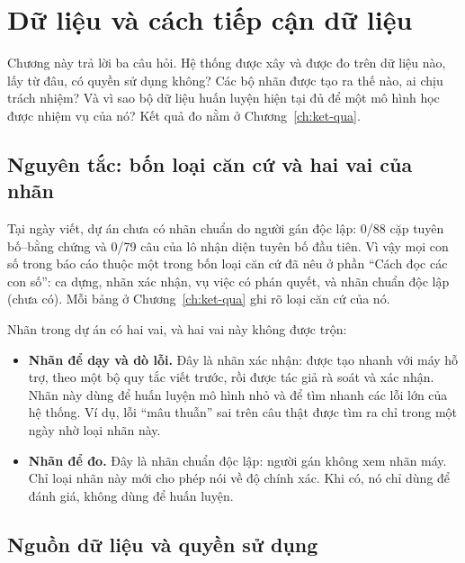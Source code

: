 \chapter{Dữ liệu và cách tiếp cận dữ liệu}\label{ch:du-lieu}

Chương này trả lời ba câu hỏi. Hệ thống được xây và được đo trên dữ liệu nào, lấy từ đâu, có quyền sử dụng không? Các bộ nhãn được tạo ra thế nào, ai chịu trách nhiệm? Và vì sao bộ dữ liệu huấn luyện hiện tại đủ để một mô hình học được nhiệm vụ của nó? Kết quả đo nằm ở Chương~\ref{ch:ket-qua}.

\section{Nguyên tắc: bốn loại căn cứ và hai vai của nhãn}\label{sec:can-cu}

Tại ngày viết, dự án chưa có nhãn chuẩn do người gán độc lập: 0/88 cặp tuyên bố–bằng chứng và 0/79 câu của lô nhận diện tuyên bố đầu tiên. Vì vậy mọi con số trong báo cáo thuộc một trong bốn loại căn cứ đã nêu ở phần “Cách đọc các con số”: ca dựng, nhãn xác nhận, vụ việc có phán quyết, và nhãn chuẩn độc lập (chưa có). Mỗi bảng ở Chương~\ref{ch:ket-qua} ghi rõ loại căn cứ của nó.

Nhãn trong dự án có hai vai, và hai vai này không được trộn:
\begin{itemize}
\item \textbf{Nhãn để dạy và dò lỗi.} Đây là nhãn xác nhận: được tạo nhanh với máy hỗ trợ, theo một bộ quy tắc viết trước, rồi được tác giả rà soát và xác nhận. Nhãn này dùng để huấn luyện mô hình nhỏ và để tìm nhanh các lỗi lớn của hệ thống. Ví dụ, lỗi “mâu thuẫn” sai trên câu thật được tìm ra chỉ trong một ngày nhờ loại nhãn này.
\item \textbf{Nhãn để đo.} Đây là nhãn chuẩn độc lập: người gán không xem nhãn máy. Chỉ loại nhãn này mới cho phép nói về độ chính xác. Khi có, nó chỉ dùng để đánh giá, không dùng để huấn luyện.
\end{itemize}

\section{Nguồn dữ liệu và quyền sử dụng}\label{sec:nguon-du-lieu}

